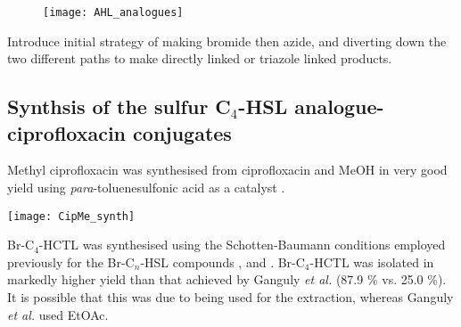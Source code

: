 \begin{figure}[H]
	\begin{center}
		\texttt{[image: AHL\_analogues]}
		\caption{\label{fig:HL4_anas}}
	\end{center}
\end{figure}

Introduce initial strategy of making bromide then azide, and diverting down the two different paths to make directly linked or triazole linked products.





\subsection{Synthsis of the sulfur C$_4$-HSL analogue-ciprofloxacin conjugates}

Methyl ciprofloxacin  was synthesised from ciprofloxacin  and MeOH in very good yield using \textit{para}-toluenesulfonic acid as a catalyst \cite{Sachin2010}.

\begin{scheme}[H]
	\begin{center}
		\texttt{[image: CipMe\_synth]}
		\caption{a) \textit{p}-TSA, MeOH, 72 h, reflux, 83.3 \%.\label{sch:CipMe_synth}}
	\end{center}
\end{scheme}

Br-C$_4$-HCTL  was synthesised using the Schotten-Baumann conditions employed previously for the Br-C$_n$-HSL compounds ,  and . Br-C$_4$-HCTL  was isolated in markedly higher yield than that achieved by Ganguly \textit{et al.} (87.9 \% vs. 25.0 \%). It is possible that this was due to  being used for the extraction, whereas Ganguly \textit{et al.} used EtOAc.

